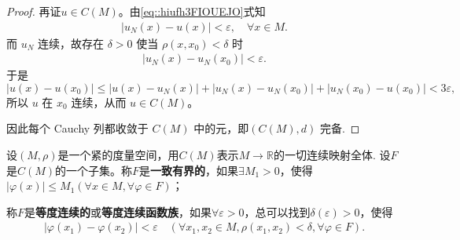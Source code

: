 \documentclass[../../main.tex]{subfiles}%
\begin{document}
\begin{proof}
再证$u\in C(M)$。由\eqref{eq::hiufh3FIOUEJO}式知
\begin{align*}
|u_N(x)-u(x)|<\varepsilon,\quad \forall x\in M.
\end{align*}
而 $u_N$ 连续，故存在 $\delta>0$ 使当 $\rho(x,x_0)<\delta$ 时 
\begin{align*}
|u_N(x)-u_N(x_0)|<\varepsilon.
\end{align*}
于是
\[
|u(x)-u(x_0)|\leqslant |u(x)-u_N(x)|+|u_N(x)-u_N(x_0)|+|u_N(x_0)-u(x_0)|<3\varepsilon,
\]
所以 $u$ 在 $x_0$ 连续，从而 $u\in C(M)$。

因此每个 Cauchy 列都收敛于 $C(M)$ 中的元，即$(C(M),d)$ 完备.
\end{proof}

\begin{definition}
设$(M,\rho)$是一个紧的度量空间，用$C(M)$表示$M\to\mathbb{R}$的一切连续映射全体.
设$F$是$C(M)$的一个子集。称$F$是\textbf{一致有界的}，如果$\exists M_1>0$，使得$|\varphi(x)|\leqslant M_1(\forall x\in M,\forall\varphi\in F)$；

称$F$是\textbf{等度连续的}或\textbf{等度连续函数族}，如果$\forall\varepsilon>0$，总可以找到$\delta(\varepsilon)>0$，使得
\begin{align*}
|\varphi(x_1)-\varphi(x_2)|<\varepsilon\quad (\forall x_1,x_2\in M,\rho(x_1,x_2)<\delta,\forall\varphi\in F).
\end{align*}
\end{definition}
\end{document}

